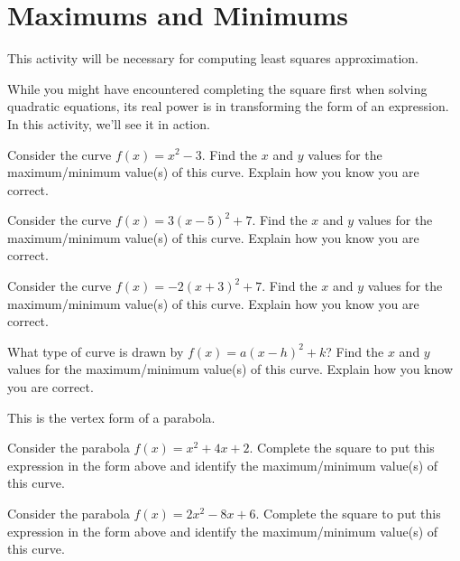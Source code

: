 \newpage
\section{Maximums and Minimums}\label{A:vertex}

\begin{teachingnote}
This activity will be necessary for computing least squares
approximation.
\end{teachingnote}


While you might have encountered completing the
square first when solving quadratic
equations, its real power is in transforming the form of an
expression. In this activity, we'll see it in action.

\begin{prob}
Consider the curve $f(x) = x^2 -3$. Find the $x$ and $y$ values for
the maximum/minimum value(s) of this curve. Explain how you know you
are correct.
\end{prob}

\begin{prob}
Consider the curve $f(x) = 3(x-5)^2 +7$. Find the $x$ and $y$ values for
the maximum/minimum value(s) of this curve. Explain how you know you
are correct.
\end{prob}



\begin{prob}
Consider the curve $f(x) = -2(x+3)^2 + 7$. Find the $x$ and $y$ values for
the maximum/minimum value(s) of this curve. Explain how you know you
are correct.
\end{prob}

\begin{prob}
What type of curve is drawn by $f(x) = a(x-h)^2+k$? Find the $x$ and
$y$ values for the maximum/minimum value(s) of this curve. Explain how
you know you are correct.
\end{prob}

\begin{teachingnote}
This is the vertex form of a parabola.
\end{teachingnote}


\begin{prob}
Consider the parabola $f(x) = x^2 + 4x + 2$. Complete the square to
put this expression in the form above and identify the maximum/minimum
value(s) of this curve.
\end{prob}


\begin{prob}
Consider the parabola $f(x) = 2x^2 - 8x + 6$. Complete the square to
put this expression in the form above and identify the maximum/minimum
value(s) of this curve.
\end{prob}

